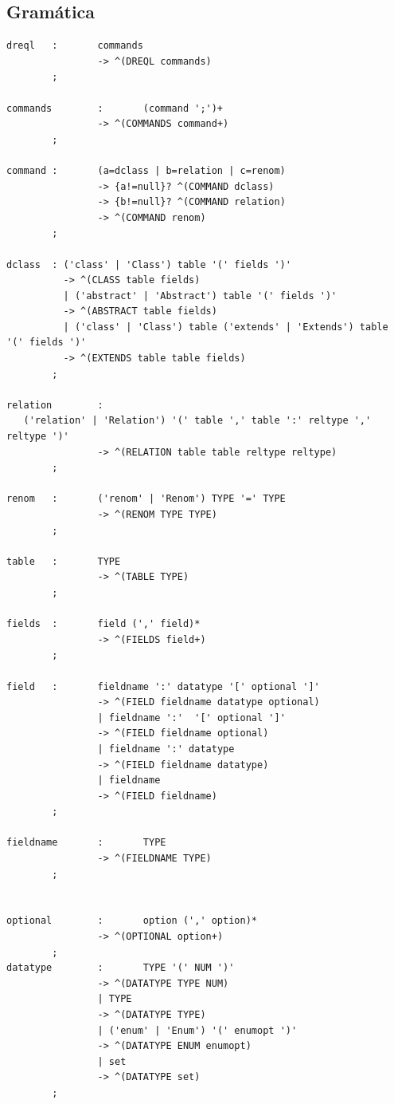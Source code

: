 \documentclass[a4paper]{article}
\begin{document}
\begin{appendix}
\section{Gramática}
\begin{small}
\begin{lstlisting}
dreql   :       commands
                -> ^(DREQL commands)
        ;

commands        :       (command ';')+
                -> ^(COMMANDS command+)
        ;

command :       (a=dclass | b=relation | c=renom)
                -> {a!=null}? ^(COMMAND dclass)
                -> {b!=null}? ^(COMMAND relation)
                -> ^(COMMAND renom)
        ;

dclass  : ('class' | 'Class') table '(' fields ')'
          -> ^(CLASS table fields)
          | ('abstract' | 'Abstract') table '(' fields ')'
          -> ^(ABSTRACT table fields)
          | ('class' | 'Class') table ('extends' | 'Extends') table '(' fields ')'
          -> ^(EXTENDS table table fields)
        ;

relation        :
   ('relation' | 'Relation') '(' table ',' table ':' reltype ',' reltype ')'
                -> ^(RELATION table table reltype reltype)
        ;

renom   :       ('renom' | 'Renom') TYPE '=' TYPE
                -> ^(RENOM TYPE TYPE)
        ;

table   :       TYPE
                -> ^(TABLE TYPE)
        ;

fields  :       field (',' field)*
                -> ^(FIELDS field+)
        ;

field   :       fieldname ':' datatype '[' optional ']'
                -> ^(FIELD fieldname datatype optional)
                | fieldname ':'  '[' optional ']'
                -> ^(FIELD fieldname optional)
                | fieldname ':' datatype
                -> ^(FIELD fieldname datatype)
                | fieldname
                -> ^(FIELD fieldname)
        ;

fieldname       :       TYPE
                -> ^(FIELDNAME TYPE)
        ;


optional        :       option (',' option)*
                -> ^(OPTIONAL option+)
        ;
datatype        :       TYPE '(' NUM ')'
                -> ^(DATATYPE TYPE NUM)
                | TYPE
                -> ^(DATATYPE TYPE)
                | ('enum' | 'Enum') '(' enumopt ')'
                -> ^(DATATYPE ENUM enumopt)
                | set
                -> ^(DATATYPE set)
        ;


\end{lstlisting}
\end{small}
\end{appendix}
\end{document}
